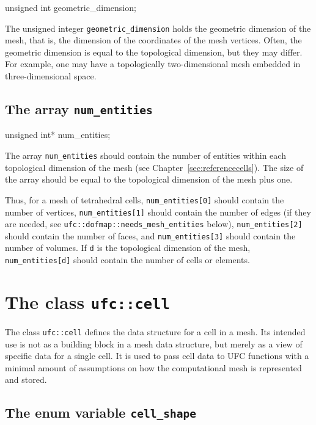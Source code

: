 \begin{code}
unsigned int geometric_dimension;
\end{code}

The unsigned integer \texttt{geometric\_dimension} holds the geometric
dimension of the mesh, that is, the dimension of the coordinates of
the mesh vertices.  Often, the geometric dimension is equal to the
topological dimension, but they may differ. For example, one may have
a topologically two-dimensional mesh embedded in three-dimensional
space.

\subsection{The array \texttt{num\_entities}}

\begin{code}
unsigned int* num_entities;
\end{code}

The array \texttt{num\_entities} should contain the number of entities
within each topological dimension of the mesh (see
Chapter~\ref{sec:referencecells}). The size of the array should be
equal to the topological dimension of the mesh plus one.

Thus, for a mesh of tetrahedral cells, \texttt{num\_entities[0]}
should contain the number of vertices, \texttt{num\_entities[1]}
should contain the number of edges (if they are needed, see
\texttt{ufc::dofmap::needs\_mesh\_entities} below),
\texttt{num\_en\-tities[2]} should contain the number of faces, and
\texttt{num\_entities[3]} should contain the number of volumes.  If
\texttt{d} is the topological dimension of the mesh,
\texttt{num\_entities[d]} should contain the number of cells or
elements.

\section{The class \texttt{ufc::cell}}

The class \texttt{ufc::cell} defines the data structure for a cell in
a mesh. Its intended use is not as a building block in a mesh data
structure, but merely as a view of specific data for a single cell.
It is used to pass cell data to UFC functions with a minimal amount of
assumptions on how the computational mesh is represented and stored.

\subsection{The enum variable \texttt{cell\_shape}}

